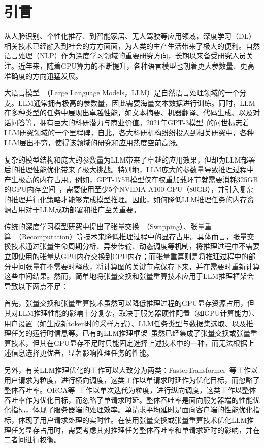 \section{引言}

从人脸识别、个性化推荐、到智能家居、无人驾驶等应用领域，深度学习（DL）相关技术已经融入到社会的方方面面，为人类的生产生活带来了极大的便利。自然语言处理（NLP）作为深度学习领域的重要研究方向，长期以来备受研究人员关注。近年来，随着GPU算力的不断提升，各种语言模型也朝着更大参数量、更高准确度的方向迅猛发展。

大语言模型~\cite{LLM}（Large Language Models，LLM）是自然语言处理领域的一个分支。LLM通常拥有极高的参数量，因此需要海量文本数据进行训练。同时，LLM在多种类型的任务中展现出卓越性能，如文本摘要、机器翻译、代码生成、以及对话问答等，拥有巨大的科研潜力与商业价值。2021年GPT-3模型~\cite{GPT3}的问世标志着LLM研究领域的一个里程碑，自此，各大科研机构纷纷投入到相关研究中，各种LLM层出不穷，使得该领域的研究和应用热度空前高涨。

复杂的模型结构和庞大的参数量为LLM带来了卓越的应用效果，但却为LLM部署后的推理性能优化带来了极大挑战。特别地，LLM庞大的参数量导致推理过程中产生极高的内存占用。例如，GPT-175B模型仅在权重加载环节就需要消耗325GB的GPU内存空间~\cite{GPT-175B资源消耗}，需要使用至少5个NVIDIA A100 GPU（80GB），并引入复杂的推理并行化策略才能够完成模型推理。因此，如何降低LLM推理任务的内存资源占用对于LLM成功部署和推广至关重要。

传统的深度学习模型研究中提出了张量交换~\cite{Swapping}（Swapping）、张量重算~\cite{Recomputation}（Recomputation）等技术来降低推理过程中的显存占用。具体而言，张量交换技术通过张量生命周期分析、异步传输、动态调度等机制，将推理过程中不需要立即使用的张量从GPU内存交换到CPU内存；而张量重算则是将推理过程中的部分中间张量在不需要时释放，将计算图的关键节点保存下来，并在需要时重新计算这些中间结果。然而，简单地将张量交换和张量重算技术应用于LLM推理框架会导致以下两点不足：

首先，张量交换和张量重算技术虽然可以降低推理过程的GPU显存资源占用，但其对LLM推理性能的影响十分复杂，取决于服务器硬件配置（如GPU计算能力）、用户设置（如生成新token时的采样方式）、LLM任务类型与数据集选取、以及推理任务的运行时信息等。已有的LLM推理框架~\cite{Swapping, vLLM, ORCA}虽然已经集成了张量交换或张量重算技术，但其在GPU显存不足时只能固定选择上述技术中的一种，而无法根据上述信息选择更优者，显著影响推理任务的性能。

另外，有关LLM推理优化的工作可以大致分为两类：FasterTransformer~\cite{FasterTransformer}等工作以用户请求为粒度，进行横向调度，这类工作以单请求时延作为优化目标，而忽略了整体吞吐率。ORCA等~\cite{vLLM, ORCA}工作以单次迭代为粒度，进行纵向调度，这类工作以整体吞吐率作为优化目标，而忽略了单请求时延。整体吞吐率是面向服务器端的性能优化指标，体现了服务器端的处理效率。单请求平均延时是面向客户端的性能优化指标，体现了用户请求处理的实时性。在使用张量交换或张量重算技术优化LLM推理任务显存占用时，需要考虑其对推理任务整体吞吐率和单请求延时的影响，并在二者间进行权衡。

